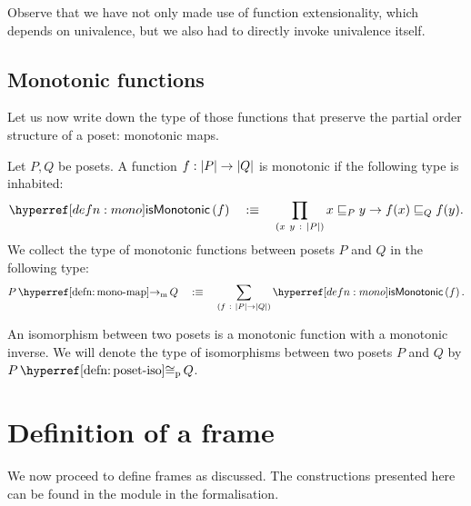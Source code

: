 Observe that we have not only made use of function extensionality, which depends on
univalence, but we also had to directly invoke univalence itself.

\subsection{Monotonic functions}

Let us now write down the type of those functions that preserve the partial order
structure of a poset: monotonic maps.

\begin{defn}\label{defn:mono-map}
  Let $P, Q$ be posets. A function $f : \left| P \right| \rightarrow \left| Q \right|$ is monotonic if the following
  type is inhabited:
  \begin{equation*}
    \ismonotonic{f} \quad\is\quad \pity{x~y}{\abs{P}}{x \sqsubseteq_P y \rightarrow f(x) \sqsubseteq_Q f(y)}.
  \end{equation*}
  We collect the type of monotonic functions between posets $P$ and $Q$ in the following
  type:
  \begin{equation*}
    \mono{P}{Q} \quad\is\quad \sigmaty{f}{\abs{P} \rightarrow \abs{Q}}{\ismonotonic{f}}.
  \end{equation*}
\end{defn}

\begin{defn}\label{defn:poset-iso}
  An isomorphism between two posets is a monotonic function with a monotonic inverse.
  We will denote the type of isomorphisms between two posets $P$ and $Q$ by
  $\posetiso{P}{Q}$.
\end{defn}

\section{Definition of a frame}\label{sec:frame}

We now proceed to define frames as discussed. The constructions presented here can be
found in the  module in the \veragda{} formalisation.

